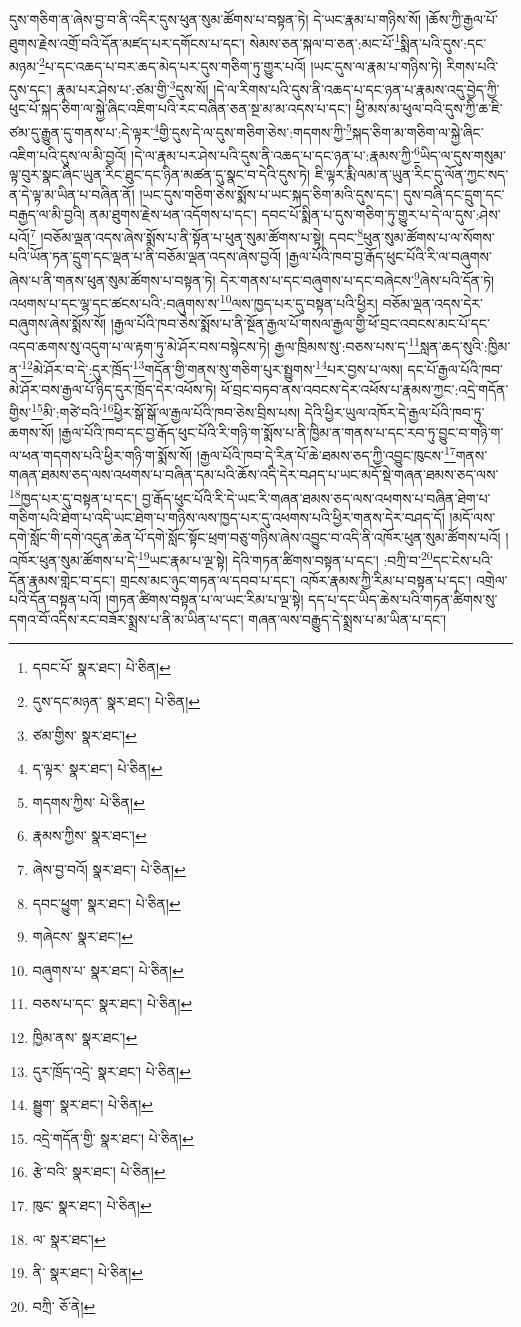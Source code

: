 དུས་གཅིག་ན་ཞེས་བྱ་བ་ནི་འདིར་དུས་ཕུན་སུམ་ཚོགས་པ་བསྟན་ཏེ། དེ་ཡང་རྣམ་པ་གཉིས་སོ། །ཆོས་ཀྱི་རྒྱལ་པོ་ཐུགས་རྗེས་འགྲོ་བའི་དོན་མཛད་པར་དགོངས་པ་དང་། སེམས་ཅན་སྐལ་བ་ཅན་:མང་པོ་\footnote{དབང་པོ་  སྣར་ཐང་།  པེ་ཅིན། }སྨིན་པའི་དུས་:དང་མཉམ་\footnote{དུས་དང་མཉན་  སྣར་ཐང་།  པེ་ཅིན། }པ་དང་འཆད་པ་བར་ཆད་མེད་པར་དུས་གཅིག་ཏུ་གྱུར་པའོ། །ཡང་དུས་ལ་རྣམ་པ་གཉིས་ཏེ། རིགས་པའི་དུས་དང་། རྣམ་པར་ཤེས་པ་:ཙམ་གྱི་\footnote{ཙམ་གྱིས་  སྣར་ཐང་། }དུས་སོ། །དེ་ལ་རིགས་པའི་དུས་ནི་འཆད་པ་དང་ཉན་པ་རྣམས་འདུ་བྱེད་ཀྱི་ཕུང་པོ་སྐད་ཅིག་ལ་སྐྱེ་ཞིང་འཇིག་པའི་རང་བཞིན་ཅན་སྔ་མ་མ་འདས་པ་དང་། ཕྱི་མས་མ་ཕུལ་བའི་དུས་ཀྱི་ཆ་ཇི་ཙམ་དུ་རྒྱུན་དུ་གནས་པ་:དེ་ལྟར་\footnote{ད་ལྟར་  སྣར་ཐང་།  པེ་ཅིན། }གྱི་དུས་དེ་ལ་དུས་གཅིག་ཅེས་:གདགས་ཀྱི་\footnote{གདགས་ཀྱིས་  པེ་ཅིན། }སྐད་ཅིག་མ་གཅིག་ལ་སྐྱེ་ཞིང་འཇིག་པའི་དུས་ལ་མི་བྱའོ། །དེ་ལ་རྣམ་པར་ཤེས་པའི་དུས་ནི་འཆད་པ་དང་ཉན་པ་:རྣམས་ཀྱི་\footnote{རྣམས་ཀྱིས་  སྣར་ཐང་། }ཡིད་ལ་དུས་གསུམ་ལྟ་བུར་སྣང་ཞིང་ཡུན་རིང་ཐུང་དང་ཉིན་མཚན་དུ་སྣང་བ་དེའི་དུས་ཏེ། ཇི་ལྟར་རྨི་ལམ་ན་ཡུན་རིང་དུ་ལོན་ཀྱང་སད་ན་དེ་ལྟ་མ་ཡིན་པ་བཞིན་ནོ། །ཡང་དུས་གཅིག་ཅེས་སྨོས་པ་ཡང་སྐད་ཅིག་མའི་དུས་དང་། དུས་བཞི་དང་དྲུག་དང་བརྒྱད་ལ་མི་བྱའི། ནམ་ཐུགས་རྗེས་ཕན་འདོགས་པ་དང་། དབང་པོ་སྨིན་པ་དུས་གཅིག་ཏུ་གྱུར་པ་དེ་ལ་དུས་:ཤེས་པའོ།\footnote{ཞེས་བྱ་བའོ།  སྣར་ཐང་།  པེ་ཅིན། } །བཅོམ་ལྡན་འདས་ཞེས་སྨོས་པ་ནི་སྟོན་པ་ཕུན་སུམ་ཚོགས་པ་སྟེ། དབང་\footnote{དབང་ཕྱུག་  སྣར་ཐང་།  པེ་ཅིན། }ཕུན་སུམ་ཚོགས་པ་ལ་སོགས་པའི་ཡོན་ཏན་དྲུག་དང་ལྡན་པ་ནི་བཅོམ་ལྡན་འདས་ཞེས་བྱའོ། །རྒྱལ་པོའི་ཁབ་བྱ་རྒོད་ཕུང་པོའི་རི་ལ་བཞུགས་ཞེས་པ་ནི་གནས་ཕུན་སུམ་ཚོགས་པ་བསྟན་ཏེ། དེར་གནས་པ་དང་བཞུགས་པ་དང་བཞེངས་\footnote{གཞེངས་  སྣར་ཐང་། }ཞེས་པའི་དོན་ཏེ། འཕགས་པ་དང་ལྷ་དང་ཚངས་པའི་:བཞུགས་ས་\footnote{བཞུགས་པ་  སྣར་ཐང་།  པེ་ཅིན། }ལས་ཁྱད་པར་དུ་བསྟན་པའི་ཕྱིར། བཅོམ་ལྡན་འདས་དེར་བཞུགས་ཞེས་སྨོས་སོ། །རྒྱལ་པོའི་ཁབ་ཅེས་སྨོས་པ་ནི་སྔོན་རྒྱལ་པོ་གསལ་རྒྱལ་གྱི་ཕོ་བྲང་འབངས་མང་པོ་དང་འདབ་ཆགས་སུ་འདུག་པ་ལ་རྟག་ཏུ་མེ་ཤོར་བས་བསྙེངས་ཏེ། རྒྱལ་ཁྲིམས་སུ་:བཅས་པས་ད་\footnote{བཅས་པ་དང་  སྣར་ཐང་།  པེ་ཅིན། }སླན་ཆད་སུའི་:ཁྱིམ་ན་\footnote{ཁྱིམ་ནས་  སྣར་ཐང་། }མེ་ཤོར་བ་དེ་:དུར་ཁྲོད་\footnote{དུར་ཁྲོད་འདྲེ་  སྣར་ཐང་།  པེ་ཅིན། }གདོན་གྱི་གནས་སུ་གཅིག་པུར་སྤྱུགས་\footnote{སྦྱུག་  སྣར་ཐང་།  པེ་ཅིན། }པར་བྱས་པ་ལས། དང་པོ་རྒྱལ་པོའི་ཁབ་མེ་ཤོར་བས་རྒྱལ་པོ་ཉིད་དུར་ཁྲོད་དེར་འཕོས་ཏེ། ཕོ་བྲང་བཏབ་ནས་འབངས་དེར་འཕོས་པ་རྣམས་ཀྱང་:འདྲེ་གདོན་གྱིས་\footnote{འདྲེ་གདོན་གྱི་  སྣར་ཐང་།  པེ་ཅིན། }མི་:གཙེ་བའི་\footnote{རྩེ་བའི་  སྣར་ཐང་།  པེ་ཅིན། }ཕྱིར་སྒོ་སྒོ་ལ་རྒྱལ་པོའི་ཁབ་ཅེས་བྲིས་པས། དེའི་ཕྱིར་ཡུལ་འཁོར་དེ་རྒྱལ་པོའི་ཁབ་ཏུ་ཆགས་སོ། །རྒྱལ་པོའི་ཁབ་དང་བྱ་རྒོད་ཕུང་པོའི་རི་གཉི་ག་སྨོས་པ་ནི་ཁྱིམ་ན་གནས་པ་དང་རབ་ཏུ་བྱུང་བ་གཉི་ག་ལ་ཕན་གདགས་པའི་ཕྱིར་གཉི་ག་སྨོས་སོ། །རྒྱལ་པོའི་ཁབ་དེ་རིན་པོ་ཆེ་ཐམས་ཅད་ཀྱི་འབྱུང་ཁུངས་\footnote{ཁུང་  སྣར་ཐང་།  པེ་ཅིན། }གནས་གཞན་ཐམས་ཅད་ལས་འཕགས་པ་བཞིན་དམ་པའི་ཆོས་འདི་དེར་བཤད་པ་ཡང་མདོ་སྡེ་གཞན་ཐམས་ཅད་ལས་\footnote{ལ་  སྣར་ཐང་། }ཁྱད་པར་དུ་བསྟན་པ་དང་། བྱ་རྒོད་ཕུང་པོའི་རི་དེ་ཡང་རི་གཞན་ཐམས་ཅད་ལས་འཕགས་པ་བཞིན་ཐེག་པ་གཅིག་པའི་ཐེག་པ་འདི་ཡང་ཐེག་པ་གཉིས་ལས་ཁྱད་པར་དུ་འཕགས་པའི་ཕྱིར་གནས་དེར་བཤད་དོ། །མདོ་ལས་དགེ་སློང་གི་དགེ་འདུན་ཆེན་པོ་དགེ་སློང་སྟོང་ཕྲག་བཅུ་གཉིས་ཞེས་འབྱུང་བ་འདི་ནི་འཁོར་ཕུན་སུམ་ཚོགས་པའོ། །འཁོར་ཕུན་སུམ་ཚོགས་པ་དེ་\footnote{ནི་  སྣར་ཐང་།  པེ་ཅིན། }ཡང་རྣམ་པ་ལྔ་སྟེ། དེའི་གཏན་ཚིགས་བསྟན་པ་དང་། :བཀྲི་བ་\footnote{བཀྲི་  ཅོ་ནེ། }དང་ངེས་པའི་དོན་རྣམས་གླེང་བ་དང་། གྲངས་མང་ཉུང་གཏན་ལ་དབབ་པ་དང་། འཁོར་རྣམས་ཀྱི་རིམ་པ་བསྟན་པ་དང་། འགྲེལ་པའི་དོན་བསྟན་པའོ། །གཏན་ཚིགས་བསྟན་པ་ལ་ཡང་རིམ་པ་ལྔ་སྟེ། དད་པ་དང་ཡིད་ཆེས་པའི་གཏན་ཚིགས་སུ་དགའ་བོ་འདིས་རང་བཟོར་སྨྲས་པ་ནི་མ་ཡིན་པ་དང་། གཞན་ལས་བརྒྱུད་དེ་སྨྲས་པ་མ་ཡིན་པ་དང་། 